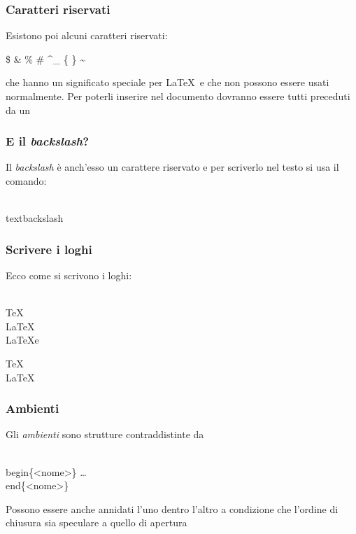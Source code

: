 \documentclass[svgnames,%
	ucs,%
	pdftex]{guitbeamer}
\begin{document}
\begin{frame}
  \frametitle{Caratteri riservati}
	Esistono poi alcuni caratteri riservati:
	\begin{LaTeXcode}
		\$ \quad \& \quad \% \quad \# \quad \^ \quad \_ \quad \{ \quad \} \quad \~\null
	\end{LaTeXcode}
  \bigskip
	che hanno un significato speciale per \LaTeX\ e che non
	possono essere usati normalmente. Per poterli inserire nel 
	documento dovranno essere tutti preceduti da un \LCmd{} 
\end{frame}
\begin{frame}
	\frametitle{E il \textit{backslash}?}
	Il \textit{backslash} \`e anch'esso un carattere riservato e per
	scriverlo nel testo si usa il comando:	
	\begin{LaTeXcode}
		\\textbackslash
	\end{LaTeXcode}
\end{frame}
\begin{frame}
  \frametitle{Scrivere i loghi}
	Ecco come si scrivono i loghi:
	\begin{LaTeXcode}
		\\TeX\n
		\\LaTeX\n
		\\LaTeXe
	\end{LaTeXcode}
  \medskip
	\begin{LaTeXoutput}
		\TeX\\
		\LaTeX\\
		\LaTeXe
	\end{LaTeXoutput}
\end{frame}
\begin{frame}
  \frametitle{Ambienti}
	Gli \emph{ambienti} sono strutture contraddistinte da
	\begin{LaTeXcode}
		\\begin\{\alert{<nome>}\}\n
		\quad\dots\n
		\\end\{\alert{<nome>}\}
	\end{LaTeXcode}
  \medskip
	Possono essere anche annidati l'uno dentro l'altro a condizione che
	l'ordine di chiusura sia speculare a quello di apertura
\end{frame}
\end{document}
